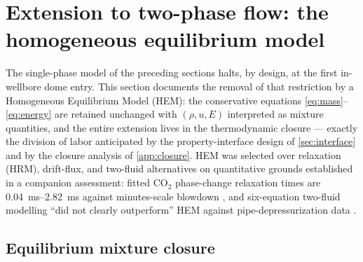 \documentclass[11pt]{article}
\begin{document}
\section{Extension to two-phase flow: the homogeneous equilibrium
model}
\label{sec:hem2p}

The single-phase model of the preceding sections halts, by design, at
the first in-wellbore dome entry. This section documents the removal
of that restriction by a Homogeneous Equilibrium Model (HEM): the
conservative equations \eqref{eq:mass}--\eqref{eq:energy} are retained
unchanged with $(\rho, u, E)$ interpreted as mixture quantities, and
the entire extension lives in the thermodynamic closure --- exactly
the division of labor anticipated by the property-interface design of
\cref{sec:interface} and by the closure analysis of
\cref{app:closure}. HEM was selected over relaxation (HRM),
drift-flux, and two-fluid alternatives on quantitative grounds
established in a companion assessment: fitted CO$_2$ phase-change
relaxation times are \SIrange{0.04}{2.82}{ms} against minutes-scale
blowdown \citep{log2024hrm}, and six-equation two-fluid modelling
``did not clearly outperform'' HEM against pipe-depressurization data
\citep{munkejord2015}.

\subsection{Equilibrium mixture closure}
\end{document}
